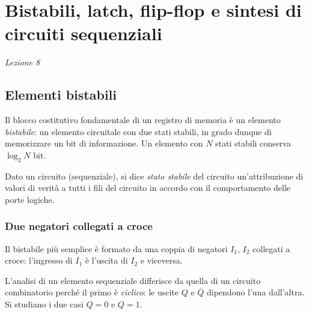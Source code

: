 \documentclass[11pt,a4paper]{article}
\begin{document}
\section[Bistabili, latch, flip-flop e sintesi di circuiti sequenziali (Lezione 8)]{Bistabili, latch, flip-flop e sintesi di circuiti sequenziali}
\noindent\emph{Lezione 8}
\subsection{Elementi bistabili}

Il blocco costitutivo fondamentale di un registro di memoria è un elemento \emph{bistabile}: un elemento circuitale con due stati stabili, in grado dunque di memorizzare un bit di informazione. Un elemento con $N$ stati stabili conserva $\log_2 N$ bit.

\begin{definizione}
Dato un circuito (sequenziale), si dice \emph{stato stabile} del circuito un'attribuzione di valori di verità a tutti i fili del circuito in accordo con il comportamento delle porte logiche.
\end{definizione}

\subsubsection{Due negatori collegati a croce}

Il bistabile più semplice è formato da una coppia di negatori $I_1$, $I_2$ collegati a croce: l'ingresso di $I_1$ è l'uscita di $I_2$ e viceversa.

\begin{center}
\end{center}

L'analisi di un elemento sequenziale differisce da quella di un circuito combinatorio perché il primo è \emph{ciclico}: le uscite $Q$ e $\overline{Q}$ dipendono l'una dall'altra. Si studiano i due casi $Q = 0$ e $Q = 1$.
\end{document}

